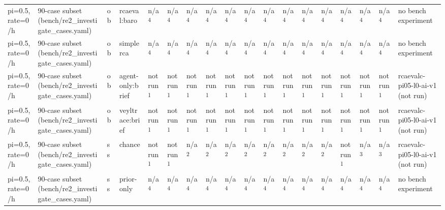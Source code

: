 \begin{table}[t]
\begin{tabular}{llllllllllllllllll}
pi=0.5, rate=0/h & 90-case subset (bench/re2\_investigate\_cases.yaml) & ob & rcaeval:baro & n/a\textsuperscript{4} & n/a\textsuperscript{4} & n/a\textsuperscript{4} & n/a\textsuperscript{4} & n/a\textsuperscript{4} & n/a\textsuperscript{4} & n/a\textsuperscript{4} & n/a\textsuperscript{4} & n/a\textsuperscript{4} & n/a\textsuperscript{4} & n/a\textsuperscript{4} & n/a\textsuperscript{4} & n/a\textsuperscript{4} & no bench experiment \\
pi=0.5, rate=0/h & 90-case subset (bench/re2\_investigate\_cases.yaml) & ob & simplerca & n/a\textsuperscript{4} & n/a\textsuperscript{4} & n/a\textsuperscript{4} & n/a\textsuperscript{4} & n/a\textsuperscript{4} & n/a\textsuperscript{4} & n/a\textsuperscript{4} & n/a\textsuperscript{4} & n/a\textsuperscript{4} & n/a\textsuperscript{4} & n/a\textsuperscript{4} & n/a\textsuperscript{4} & n/a\textsuperscript{4} & no bench experiment \\
pi=0.5, rate=0/h & 90-case subset (bench/re2\_investigate\_cases.yaml) & ob & agent-only:brief & not run\textsuperscript{1} & not run\textsuperscript{1} & not run\textsuperscript{1} & not run\textsuperscript{1} & not run\textsuperscript{1} & not run\textsuperscript{1} & not run\textsuperscript{1} & not run\textsuperscript{1} & not run\textsuperscript{1} & not run\textsuperscript{1} & not run\textsuperscript{1} & not run\textsuperscript{1} & not run\textsuperscript{1} & rcaevalc-pi05-l0-ai-v1 (not run) \\
pi=0.5, rate=0/h & 90-case subset (bench/re2\_investigate\_cases.yaml) & ob & veyltrace:brief & not run\textsuperscript{1} & not run\textsuperscript{1} & not run\textsuperscript{1} & not run\textsuperscript{1} & not run\textsuperscript{1} & not run\textsuperscript{1} & not run\textsuperscript{1} & not run\textsuperscript{1} & not run\textsuperscript{1} & not run\textsuperscript{1} & not run\textsuperscript{1} & not run\textsuperscript{1} & not run\textsuperscript{1} & rcaevalc-pi05-l0-ai-v1 (not run) \\
pi=0.5, rate=0/h & 90-case subset (bench/re2\_investigate\_cases.yaml) & ss & chance & not run\textsuperscript{1} & not run\textsuperscript{1} & n/a\textsuperscript{2} & n/a\textsuperscript{2} & n/a\textsuperscript{2} & n/a\textsuperscript{2} & n/a\textsuperscript{2} & n/a\textsuperscript{2} & n/a\textsuperscript{2} & n/a\textsuperscript{2} & not run\textsuperscript{1} & n/a\textsuperscript{3} & n/a\textsuperscript{3} & rcaevalc-pi05-l0-ai-v1 (not run) \\
pi=0.5, rate=0/h & 90-case subset (bench/re2\_investigate\_cases.yaml) & ss & prior-only & n/a\textsuperscript{4} & n/a\textsuperscript{4} & n/a\textsuperscript{4} & n/a\textsuperscript{4} & n/a\textsuperscript{4} & n/a\textsuperscript{4} & n/a\textsuperscript{4} & n/a\textsuperscript{4} & n/a\textsuperscript{4} & n/a\textsuperscript{4} & n/a\textsuperscript{4} & n/a\textsuperscript{4} & n/a\textsuperscript{4} & no bench experiment \\

\end{tabular}
\end{table}
